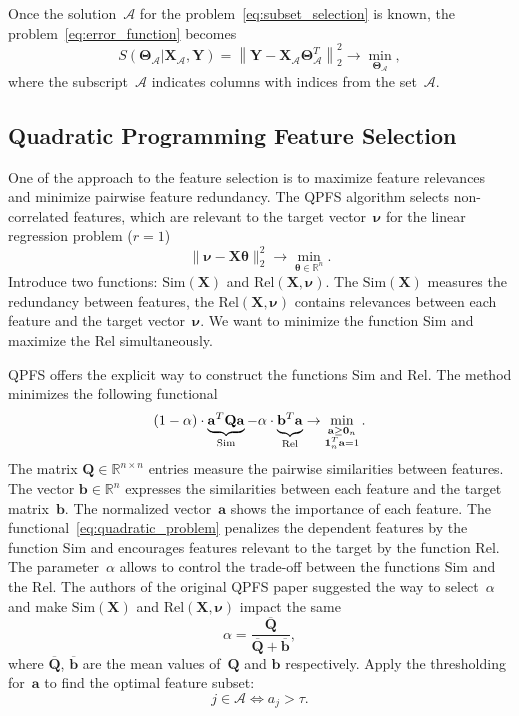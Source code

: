 \documentclass[12pt,twoside]{article}
\newcommand{\ba}{\mathbf{a}}
\newcommand{\bb}{\mathbf{b}}
\newcommand{\bY}{\mathbf{Y}}
\newcommand{\bX}{\mathbf{X}}
\newcommand{\bQ}{\mathbf{Q}}
\newcommand{\bbR}{\mathbb{R}}
\newcommand{\cA}{\mathcal{A}}
\newcommand{\bnu}{\boldsymbol{\nu}}
\newcommand{\btheta}{\boldsymbol{\theta}}
\newcommand{\bTheta}{\boldsymbol{\Theta}}
\newcommand{\bOne}{\boldsymbol{1}}
\newcommand{\bZero}{\boldsymbol{0}}
\begin{document}
Once the solution~$\cA$ for the problem~\eqref{eq:subset_selection} is known, the problem~\eqref{eq:error_function} becomes
\begin{equation}
S(\bTheta_{\cA} | \bX_{\cA}, \bY) = {\left\| \mathbf{Y} - \bX_{\cA}\bTheta^T_{\cA} \right\| }_2^2 \rightarrow\min_{\bTheta_{\cA}},
\end{equation}
where the subscript~$\cA$ indicates columns with indices from the set~$\cA$.

\subsection{Quadratic Programming Feature Selection}
One of the approach to the feature selection is to maximize feature relevances and minimize pairwise feature redundancy.
The QPFS algorithm selects non-correlated features, which are relevant to the target vector~$\bnu$ for the linear regression problem ($r=1$)
\begin{equation*}
	\| \bnu - \bX \btheta\|_2^2 \rightarrow\min_{\btheta \in \bbR^{n}}.
\end{equation*}
Introduce two functions: $\text{Sim}(\bX)$ and $\text{Rel}(\bX, \bnu)$.
The $\text{Sim}(\bX)$ measures the redundancy between features, the $\text{Rel}(\bX, \bnu)$ contains relevances between each feature and the target vector~$\bnu$.
We want to minimize the function Sim and maximize the Rel simultaneously.

QPFS offers the explicit way to construct the functions Sim and Rel.
The method minimizes the following functional
\begin{equation}
	(1 - \alpha) \cdot \underbrace{\ba^T \bQ \ba}_{\text{Sim}} - \alpha \cdot \underbrace{\vphantom{()} \mathbf{b}^T \ba}_{\text{Rel}} \rightarrow \min_{\substack{\ba \geq \bZero_n \\ \bOne_n^T \ba=1}}.
	\label{eq:quadratic_problem}
\end{equation}
The matrix $\bQ \in \bbR^{n \times n}$ entries measure the pairwise similarities between features.
The vector $\mathbf{b} \in \bbR^n$ expresses the similarities between each feature and the target matrix~$\bb$.
The normalized vector~$\ba$ shows the importance of each feature.
The functional~\eqref{eq:quadratic_problem} penalizes the dependent features by the function Sim and encourages features relevant to the target by the function Rel.
The parameter~$\alpha$ allows to control the trade-off between the functions Sim and the Rel.
The authors of the original QPFS paper suggested the way to select~$\alpha$ and make $\text{Sim}(\bX)$ and $\text{Rel}(\bX, \bnu)$ impact the same
\begin{equation*}
	\alpha = \frac{\overline{\bQ}}{\overline{\bQ} + \overline{\bb}},
\end{equation*}
where $\overline{\bQ}$, $\overline{\bb}$ are the mean values of~$\bQ$ and $\bb$ respectively.
Apply the thresholding for~$\ba$ to find the optimal feature subset:
\[
	j \in \mathcal{A} \Leftrightarrow a_j > \tau.
\]
\end{document}
